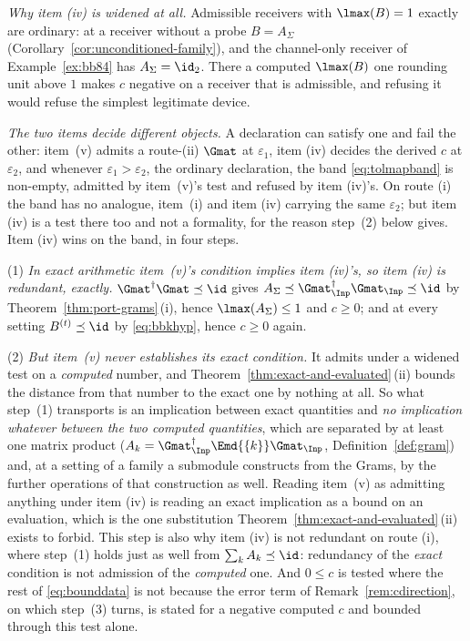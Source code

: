 \begin{remark}\label{rem:bound-data-band}
\emph{Why item (iv) is widened at all.} Admissible receivers with
$\lmax(B)=1$ exactly are ordinary: at a receiver without a probe $B=A_\Sigma$
(Corollary~\ref{cor:unconditioned-family}), and the channel-only receiver of
Example~\ref{ex:bb84} has $A_\Sigma=\id_2$. There a computed $\lmax(B)$ one
rounding unit above $1$ makes $c$ negative on a receiver that is admissible,
and refusing it would refuse the simplest legitimate device.

\emph{The two items decide different objects.} A declaration can satisfy one
and fail the other: item~(v) admits a route-(ii) $\Gmat$ at $\varepsilon_1$,
item (iv) decides the derived $c$ at $\varepsilon_2$, and whenever
$\varepsilon_1>\varepsilon_2$, the ordinary declaration, the band
\eqref{eq:tolmapband} is non-empty, admitted by item~(v)'s test and refused by
item (iv)'s. On route (i) the band has no analogue, item~(i) and item (iv)
carrying the same $\varepsilon_2$; but item (iv) is a test there too and not a
formality, for the reason step~(2) below gives. Item (iv) wins on the band, in
four steps.

(1) \emph{In exact arithmetic item~(v)'s condition implies item (iv)'s, so
item (iv) is redundant, exactly.} $\Gmat^\dagger\Gmat\preceq\id$ gives
$A_\Sigma\preceq\Gmat_{\Inp}^\dagger\Gmat_{\Inp}\preceq\id$ by
Theorem~\ref{thm:port-grams}\,(i), hence $\lmax(A_\Sigma)\le1$ and $c\ge0$; and at
every setting $B^{(t)}\preceq\id$ by \eqref{eq:bbkhyp}, hence $c\ge0$ again.

(2) \emph{But item~(v) never establishes its exact condition.} It admits under
a widened test on a \emph{computed} number, and Theorem~\ref{thm:exact-and-evaluated}\,(ii)
bounds the distance from that number to the exact one by nothing at all. So
what step~(1) transports is an implication between exact quantities and
\emph{no implication whatever between the two computed quantities}, which are
separated by at least one matrix product
($A_k=\Gmat_{\Inp}^\dagger\Emd{\{k\}}\Gmat_{\Inp}$,
Definition~\ref{def:gram}) and, at a setting of a family a submodule
constructs from the Grams, by the further operations of that construction as
well. Reading
item~(v) as admitting anything under item (iv) is reading an exact implication
as a bound on an evaluation, which is the one substitution
Theorem~\ref{thm:exact-and-evaluated}\,(ii) exists to forbid. This step is also why item (iv)
is not redundant on route (i), where step~(1) holds just as well from
$\sum_kA_k\preceq\id$: redundancy of the \emph{exact} condition is not
admission of the \emph{computed} one. And $0\le c$ is tested where the rest of
\eqref{eq:bounddata} is not because the error term of
Remark~\ref{rem:cdirection}, on which step~(3) turns, is stated for a negative
computed $c$ and bounded through this test alone.


\end{remark}
